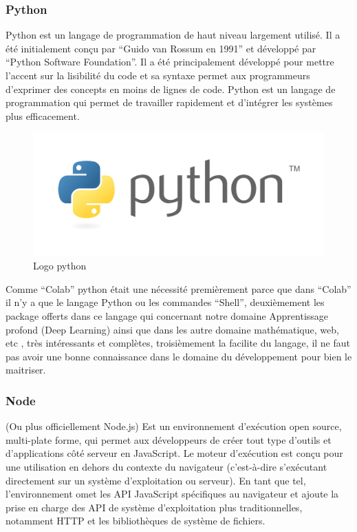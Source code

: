 \documentclass[12pt]{article}
\begin{document}
\subsubsection*{Python}
Python est un langage de programmation de haut niveau largement utilisé. Il a été initialement conçu par “Guido van Rossum en 1991” et développé par “Python Software Foundation”. Il a été principalement développé pour mettre l'accent sur la lisibilité du code et sa syntaxe permet aux programmeurs d'exprimer des concepts en moins de lignes de code. Python est un langage de programmation qui permet de travailler rapidement et d’intégrer les systèmes plus efficacement.

\begin{figure}[h]
	\centering
	\includegraphics[width=12cm]{img-Chapiter-4/Python_logo.png}
	\caption{Logo python}
\end{figure}

Comme “Colab” python était une nécessité premièrement parce que dans “Colab” il n'y a que le langage Python ou les commandes “Shell”,  deuxièmement les package offerts  dans ce langage qui concernant notre domaine Apprentissage profond (Deep Learning) ainsi que dans les autre domaine mathématique, web, etc , très intéressants et complètes,  troisièmement la facilite du langage, il ne faut pas avoir une bonne connaissance dans le domaine du développement pour bien le maitriser.

\subsubsection*{Node}
(Ou plus officiellement Node.js) Est un environnement d'exécution open source, multi-plate forme, qui permet aux développeurs de créer tout type d'outils et d'applications côté serveur en JavaScript. Le moteur d’exécution est conçu pour une utilisation en dehors du contexte du navigateur (c’est-à-dire s’exécutant directement sur un système d’exploitation ou serveur). En tant que tel, l'environnement omet les API JavaScript spécifiques au navigateur et ajoute la prise en charge des API de système d'exploitation plus traditionnelles, notamment HTTP et les bibliothèques de système de fichiers.
\end{document}
